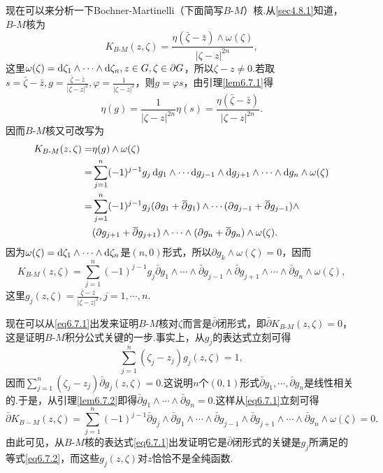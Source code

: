 现在可以来分析一下Bochner-Martinelli（下面简写$B\text{-}M$）核.从\ref{sec4.8.1}知道，$B\text{-}M$核为
\[K_{B\text{-}M}(z,\zeta)=\frac{\eta\left(\bar{\zeta}-\bar{z}\right)\wedge\omega(\zeta)}{|\zeta-z|^{2n}},\]
这里$\omega(\zeta)=\mathop{}\!\mathrm{d}\zeta_1\wedge\cdots\wedge\mathop{}\!\mathrm{d}\zeta_n,z\in G,\zeta\in\partial G$，所以$\zeta-z\neq0$.若取$s=\bar{\zeta}-\bar{z},g=\frac{\bar{\zeta}-\bar{z}}{|\zeta-z|^2},\varphi=\frac1{|\zeta-z|^2}$，则$g=\varphi s$，由引理\ref{lem6.7.1}得
\[\eta(g)=\frac1{|\zeta-z|^{2n}}\eta(s)=\frac{\eta\left(\bar{\zeta}-\bar{z}\right)}{|\zeta-z|^{2n}}.\]
因而$B\text{-}M$核又可改写为
\begin{align*}
	K_{B\text{-}M}(z,\zeta)
	=&\eta(g)\wedge\omega(\zeta)\\
	=&\sum_{j=1}^{n}(-1)^{j-1}g_j\mathop{}\!\mathrm{d} g_1\wedge\cdots\mathop{}\!\mathrm{d} g_{j-1}\wedge\mathop{}\!\mathrm{d} g_{j+1}\wedge\cdots\wedge\mathop{}\!\mathrm{d} g_n\wedge\omega(\zeta)\\
	=&\sum_{j=1}^{n}(-1)^{j-1}g_j(\partial g_1+{}\mkern1mu\overline{\mkern-1mu\partial}g_1)\wedge\cdots(\partial g_{j-1}+{}\mkern1mu\overline{\mkern-1mu\partial}g_{j-1})\wedge\\
	&(\partial g_{j+1}+{}\mkern1mu\overline{\mkern-1mu\partial}g_{j+1})\wedge\cdots\wedge(\partial g_n+{}\mkern1mu\overline{\mkern-1mu\partial}g_n)\wedge\omega(\zeta).
\end{align*}
因为$\omega(\zeta)=\mathop{}\!\mathrm{d}\zeta_1\wedge\cdots\wedge\mathop{}\!\mathrm{d} \zeta_n$是$(n,0)$形式，所以$\partial g_k\wedge\omega(\zeta)=0$，因而
\begin{equation}\label{eq6.7.1}
	K_{B\text{-}M}(z,\zeta)=\sum_{j=1}^{n}(-1)^{j-1}g_j\bar{\partial}g_1\wedge\cdots\wedge\bar{\partial}g_{j-1}\wedge\bar{\partial}g_{j+1}\wedge\cdots\wedge\bar{\partial}g_n\wedge\omega(\zeta),
\end{equation}
这里$g_j(z,\zeta)=\frac{\bar{\zeta}-\bar{z}}{|\zeta-z|^2},j=1,\cdots,n$.

现在可以从\eqref{eq6.7.1}出发来证明$B\text{-}M$核对$\zeta$而言是$\bar{\partial}$闭形式，即$\bar{\partial}K_{B\text{-}M}(z,\zeta)=0$，这是证明$B\text{-}M$积分公式关键的一步.事实上，从$g_j$的表达式立刻可得
\begin{equation}\label{eq6.7.2}
	\sum_{j=1}^{n}(\zeta_j-z_j)g_j(z,\zeta)=1,
\end{equation}
因而$\sum_{j=1}^{n}(\zeta_j-z_j)\bar{\partial}g_j(z,\zeta)=0$.这说明$n$个$(0,1)$形式$\bar{\partial}g_1,\cdots,\bar{\partial}g_n$是线性相关的.于是，从引理\ref{lem6.7.2}即得$\bar{\partial}g_1\wedge\cdots\wedge\bar{\partial}g_n=0$.这样从\eqref{eq6.7.1}立刻可得
\[\bar{\partial}K_{B-M}(z,\zeta)=\sum_{j=1}^{n}(-1)^{j-1}\bar{\partial}g_j\wedge\bar{\partial}g_1\wedge\cdots\wedge\bar{\partial}g_{j-1}\wedge\bar{\partial}g_{j+1}\wedge\cdots\wedge\bar{\partial}g_n\wedge\omega(\zeta)=0.\]
由此可见，从$B\text{-}M$核的表达式\eqref{eq6.7.1}出发证明它是$\bar{\partial}$闭形式的关键是$g_j$所满足的等式\eqref{eq6.7.2}，而这些$g_j(z,\zeta)$对$z$恰恰不是全纯函数.

